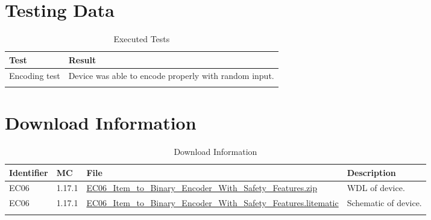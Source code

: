 \documentclass[10pt]{datasheet}
\begin{document}
\section{Testing Data}
\begin{table}[h]
\caption{Executed Tests}
\begin{tabularx}{\textwidth}{l | X}
    \thickhline
    \textbf{Test} & \textbf{Result} \\
    \hline
    Encoding test & Device was able to encode properly with random input. \\
    \thickhline
\end{tabularx}
\end{table}

\section{Download Information}
\begin{table}[h]
    \caption{Download Information}
    \begin{tabularx}{\textwidth}{l | l | l | X}
        \thickhline
        \textbf{Identifier} & \textbf{MC} & \textbf{File} & \textbf{Description} \\
        \hline
        EC06 & 1.17.1 & \href{https://github.com/Soontech-Annals/Archive/blob/364bde8dbcbc2e5337489ff435bcda9b387017e2/Archive/encoders/EC06\%20Item\%20to\%20Binary\%20Encoder\%20With\%20Safety\%20Features/EC06\_Item\_to\_Binary\_Encoder\_With\_Safety\_Features.zip?raw=1}{EC06\_Item\_to\_Binary\_Encoder\_With\_Safety\_Features.zip} & WDL of device. \\
        \hline
        EC06 & 1.17.1 & \href{https://github.com/Soontech-Annals/Archive/blob/364bde8dbcbc2e5337489ff435bcda9b387017e2/Archive/encoders/EC06\%20Item\%20to\%20Binary\%20Encoder\%20With\%20Safety\%20Features/EC06\_Item\_to\_Binary\_Encoder\_With\_Safety\_Features.litematic?raw=1}{EC06\_Item\_to\_Binary\_Encoder\_With\_Safety\_Features.litematic} & Schematic of device. \\
        \hline
        \thickhline
    \end{tabularx}
\end{table}
\end{document}
